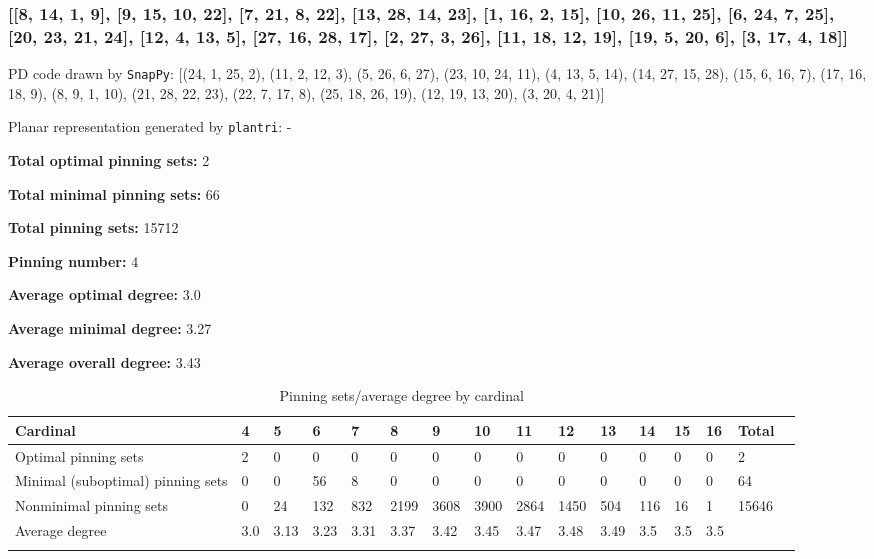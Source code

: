 \documentclass{article}%
\begin{document}
\newpage

\subsubsection{[[8, 14, 1, 9], [9, 15, 10, 22], [7, 21, 8, 22], [13, 28, 14, 23], [1, 16, 2, 15], [10, 26, 11, 25], [6, 24, 7, 25], [20, 23, 21, 24], [12, 4, 13, 5], [27, 16, 28, 17], [2, 27, 3, 26], [11, 18, 12, 19], [19, 5, 20, 6], [3, 17, 4, 18]]}

{\small\noindent PD code drawn by \texttt{SnapPy}: [(24, 1, 25, 2), (11, 2, 12, 3), (5, 26, 6, 27), (23, 10, 24, 11), (4, 13, 5, 14), (14, 27, 15, 28), (15, 6, 16, 7), (17, 16, 18, 9), (8, 9, 1, 10), (21, 28, 22, 23), (22, 7, 17, 8), (25, 18, 26, 19), (12, 19, 13, 20), (3, 20, 4, 21)]}

{\small\noindent Planar representation generated by \texttt{plantri}: -}

\begin{multicols}{2}
{\normalsize \noindent\textbf{Total optimal pinning sets:} 2

\noindent\textbf{Total minimal pinning sets:} 66

\noindent\textbf{Total pinning sets:} 15712

\noindent\textbf{Pinning number:} 4

}
\columnbreak

{\normalsize \noindent\textbf{Average optimal degree:} 3.0

\noindent\textbf{Average minimal degree:} 3.27

\noindent\textbf{Average overall degree:} 3.43

}
\end{multicols}

\begin{table}[ht]
	\caption{Pinning sets/average degree by cardinal}
	\centering
	\renewcommand{\arraystretch}{1.5}
	\begin{tabularx}{\textwidth}{lXXXXXXXXXXXXXXX}
		\toprule
			Cardinal & 4 & 5 & 6 & 7 & 8 & 9 & 10 & 11 & 12 & 13 & 14 & 15 & 16 & Total\\
			\hline
			Optimal pinning sets & 2 & 0 & 0 & 0 & 0 & 0 & 0 & 0 & 0 & 0 & 0 & 0 & 0 & 2 \\
			Minimal (suboptimal) pinning sets & 0 & 0 & 56 & 8 & 0 & 0 & 0 & 0 & 0 & 0 & 0 & 0 & 0 & 64 \\
			Nonminimal pinning sets & 0 & 24 & 132 & 832 & 2199 & 3608 & 3900 & 2864 & 1450 & 504 & 116 & 16 & 1 & 15646 \\
			Average degree & 3.0 & 3.13 & 3.23 & 3.31 & 3.37 & 3.42 & 3.45 & 3.47 & 3.48 & 3.49 & 3.5 & 3.5 & 3.5 &  \\
		\bottomrule \\ 
	\end{tabularx}
\end{table}
\end{document}
